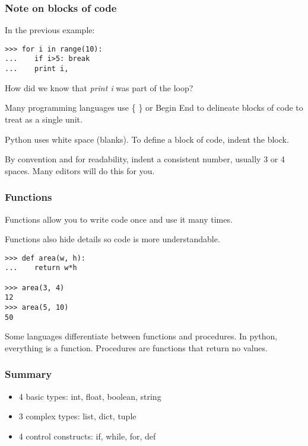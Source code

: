 \documentclass[10pt]{beamer}
\begin{document}
\begin{frame}[fragile]
\frametitle{Note on blocks of code}

In the previous example:
\begin{verbatim}
>>> for i in range(10):
...    if i>5: break
...    print i,
\end{verbatim}

How did we know that \textit{print i} was part of the loop?
\vspace{2mm}

Many programming languages use \{ \} or Begin End to delineate blocks of
code to treat as a single unit.
\vspace{2mm}

Python uses white space (blanks).  To define a block of code, indent the block.
\vspace{2mm}

By convention and for readability, indent a consistent number, 
usually 3 or 4 spaces.  Many editors will do this for you.

\end{frame}

\begin{frame}[fragile]
\frametitle{Functions}

Functions allow you to write code once and use it many times.
\vspace{2mm}

Functions also hide details so code is more understandable.
\begin{verbatim}
>>> def area(w, h):
...    return w*h

>>> area(3, 4)
12
>>> area(5, 10)
50
\end{verbatim}

Some languages differentiate between functions and procedures.  In python, everything is a function.
Procedures are functions that return no values.

\end{frame}

\begin{frame}[fragile]
\frametitle{Summary}
\begin{itemize}
\item 4 basic types: int, float, boolean, string
\item 3 complex types: list, dict, tuple
\item 4 control constructs: if, while, for, def
\end{itemize}
\end{frame}
\end{document}
